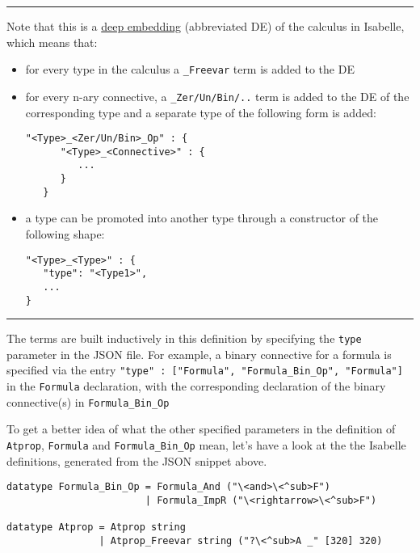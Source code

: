\begin{enumerate}
  \begin{center}\rule{3in}{0.4pt}\end{center}

  Note that this is a \href{/doc/calculi.html\#deep-embedding}{deep
  embedding} (abbreviated DE) of the calculus in Isabelle, which means
  that:

  \begin{itemize}
  \item
    for every type in the calculus a \texttt{\_Freevar} term is added to
    the DE
  \item
    for every n-ary connective, a \texttt{\_Zer/Un/Bin/..} term is added
    to the DE of the corresponding type and a separate type of the
    following form is added:

\begin{verbatim}
"<Type>_<Zer/Un/Bin>_Op" : {
      "<Type>_<Connective>" : {
         ...
      }
   }
\end{verbatim}
  \item
    a type can be promoted into another type through a constructor of
    the following shape:

\begin{verbatim}
"<Type>_<Type>" : {
   "type": "<Type1>",
   ...
}
\end{verbatim}
  \end{itemize}

  \begin{center}\rule{3in}{0.4pt}\end{center}

  The terms are built inductively in this definition by specifying the
  \texttt{type} parameter in the JSON file. For example, a binary
  connective for a formula is specified via the entry
  \texttt{"type" : {[}"Formula", "Formula\_Bin\_Op", "Formula"{]}} in
  the \texttt{Formula} declaration, with the corresponding declaration
  of the binary connective(s) in \texttt{Formula\_Bin\_Op}

  To get a better idea of what the other specified parameters in the
  definition of \texttt{Atprop}, \texttt{Formula} and
  \texttt{Formula\_Bin\_Op} mean, let's have a look at the the Isabelle
  definitions, generated from the JSON snippet above.

\begin{verbatim}
datatype Formula_Bin_Op = Formula_And ("\<and>\<^sub>F")
                        | Formula_ImpR ("\<rightarrow>\<^sub>F")

datatype Atprop = Atprop string
                | Atprop_Freevar string ("?\<^sub>A _" [320] 320)


\end{verbatim}
\end{enumerate}
